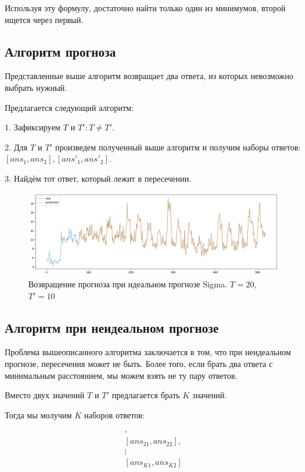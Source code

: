 \documentclass{article}
\begin{document}
Используя эту формулу, достаточно найти только один из минимумов, второй ищется через первый.

\subsection{Алгоритм прогноза}

Представленные выше алгоритм возвращает два ответа, из которых невозможно выбрать нужный.

Предлагается следующий алгоритм:

1. Зафиксируем $T$ и $T': T \neq T'$.

2. Для $T$ и $T'$ произведем полученный выше алгоритм и получим наборы ответов: $[ans_1, ans_2], [ans'_1, ans'_2]$.

3. Найдём тот ответ, который лежит в пересечении.


\begin{figure}[H]
	\centering
	\includegraphics[width=\textwidth]{TwoTAlgo.png}
	\caption{Возвращение прогноза при идеальном прогнозе Sigma. $T=20$, $T'=10$}
	\label{fig:fig3}
\end{figure}

\subsection{Алгоритм при неидеальном прогнозе}

Проблема вышеописанного алгоритма заключается в том, что при неидеальном прогнозе, пересечения может не быть. Более того, если брать два ответа с минимальным расстоянием, мы можем взять не ту пару ответов.

Вместо двух значений  $T$ и $T'$ предлагается брать $K$ значений.

Тогда мы молучим $K$ наборов ответов:

\begin{gather*}
	[ans_{11}, ans_{12}],\\
	[ans_{21}, ans_{22}],\\
	\vdots \\
	[ans_{K1}, ans_{K2}]
\end{gather*}
\end{document}
